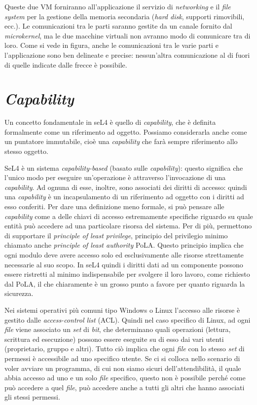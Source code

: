 Queste due VM forniranno all'applicazione il servizio di \textit{networking} e il \textit{file system} per la gestione della memoria secondaria (\textit{hard disk}, supporti rimovibili, ecc.). Le comunicazioni tra le parti saranno gestite da un canale fornito dal \textit{microkernel}, ma le due macchine virtuali non avranno modo di comunicare tra di loro. Come si vede in figura, anche le comunicazioni tra le varie parti e l'applicazione sono ben delineate e precise: nessun'altra comunicazione al di fuori di quelle indicate dalle frecce è possibile.

\section{\textit{Capability}}
Un concetto fondamentale in seL4 è quello di \textit{capability}, che è definita formalmente come un riferimento ad oggetto. Possiamo considerarla anche come un puntatore immutabile, cioè una \textit{capability} che farà sempre riferimento allo stesso oggetto.

SeL4 è un sistema \textit{capability-based} (basato sulle \textit{capability}): questo significa che l'unico modo per eseguire un'operazione è attraverso l'invocazione di una \textit{capability}. Ad ognuna di esse, inoltre, sono associati dei diritti di accesso: quindi una \textit{capability} è un incapsulamento di un riferimento ad oggetto con i diritti ad esso conferiti.
Per dare una definizione meno formale, si può pensare alle \textit{capability} come a delle chiavi di accesso estremamente specifiche riguardo su quale entità può accedere ad una particolare risorsa del sistema. Per di più, permettono di supportare il \textit{principle of least privilege}, principio del privilegio minimo chiamato anche \textit{principle of least authority} PoLA. Questo principio implica che ogni modulo deve avere accesso solo ed esclusivamente alle risorse strettamente necessarie al suo scopo.
In seL4 quindi i diritti dati ad un componente possono essere ristretti al minimo indispensabile per svolgere il loro lavoro, come richiesto dal PoLA, il che chiaramente è un grosso punto a favore per quanto riguarda la sicurezza.

Nei sistemi operativi più comuni tipo Windows o Linux l'accesso alle risorse è gestito dalle \textit{access-control list} (ACL). Quindi nel caso specifico di Linux, ad ogni \textit{file} viene associato un \textit{set} di \textit{bit}, che determinano quali operazioni (lettura, scrittura ed esecuzione) possono essere eseguite su di esso dai vari utenti (proprietario, gruppo e altri). Tutto ciò implica che ogni \textit{file} con lo stesso \textit{set} di permessi è accessibile ad uno specifico utente. Se ci si colloca nello scenario di voler avviare un programma, di cui non siamo sicuri dell'attendibilità, il quale abbia accesso ad uno e un solo \textit{file} specifico, questo non è possibile perché come può accedere a quel \textit{file}, può accedere anche a tutti gli altri che hanno associati gli stessi permessi.

